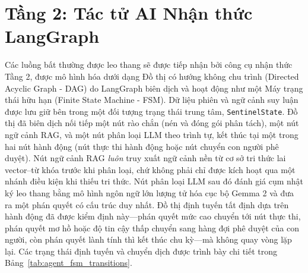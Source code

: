 \section{Tầng 2: Tác tử AI Nhận thức LangGraph}

Các luồng bất thường được leo thang sẽ được tiếp nhận bởi công cụ nhận thức Tầng 2, được mô hình hóa dưới dạng Đồ thị có hướng không chu trình (Directed Acyclic Graph - DAG) do LangGraph \cite{langgraph2024} biên dịch và hoạt động như một Máy trạng thái hữu hạn (Finite State Machine - FSM). Dữ liệu phiên và ngữ cảnh suy luận được lưu giữ bên trong một đối tượng trạng thái trung tâm, \texttt{SentinelState}. Đồ thị đã biên dịch nối tiếp một nút rào chắn (nén và đóng gói phân tách), một nút ngữ cảnh RAG, và một nút phân loại LLM theo trình tự, kết thúc tại một trong hai nút hành động (nút thực thi hành động hoặc nút chuyển con người phê duyệt). Nút ngữ cảnh RAG \emph{luôn} truy xuất ngữ cảnh nền từ cơ sở tri thức lai vector--từ khóa trước khi phân loại, chứ không phải chỉ được kích hoạt qua một nhánh điều kiện khi thiếu tri thức. Nút phân loại LLM sau đó đánh giá cụm nhật ký leo thang bằng mô hình ngôn ngữ lớn lượng tử hóa cục bộ Gemma 2 \cite{gemma_2_2024} và đưa ra một phán quyết có cấu trúc duy nhất. Đồ thị định tuyến tất định dựa trên hành động đã được kiểm định này---phán quyết mức cao chuyển tới nút thực thi, phán quyết mơ hồ hoặc độ tin cậy thấp chuyển sang hàng đợi phê duyệt của con người, còn phán quyết lành tính thì kết thúc chu kỳ---mà không quay vòng lặp lại. Các trạng thái định tuyến và chuyển dịch được trình bày chi tiết trong Bảng~\ref{tab:agent_fsm_transitions}.

